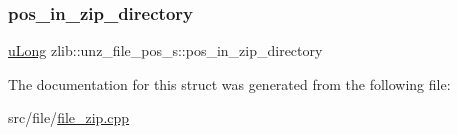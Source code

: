 \subsubsection{\texorpdfstring{pos\+\_\+in\+\_\+zip\+\_\+directory}{pos\_in\_zip\_directory}}
{\footnotesize\ttfamily \hyperlink{namespacezlib_a3bc0123d9337acd75d286df79e6cf7da}{u\+Long} zlib\+::unz\+\_\+file\+\_\+pos\+\_\+s\+::pos\+\_\+in\+\_\+zip\+\_\+directory}



The documentation for this struct was generated from the following file\+:\begin{DoxyCompactItemize}
\item 
src/file/\hyperlink{file__zip_8cpp}{file\+\_\+zip.\+cpp}\end{DoxyCompactItemize}
